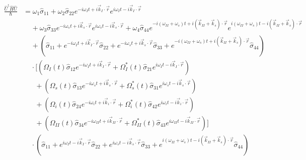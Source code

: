 \documentclass[aps,pra,showpacs,amsmath,amssymb,nofootinbib,longbibliography,superscriptaddress
]{revtex4-1}
\theoremstyle{definition}
\theoremstyle{remark}
\newcommand{\0}{\hat{0}}
\begin{document}
\begin{align}
    \frac{\hat{U}^{\dagger} \hat{H} \hat{U}}{\hbar}
    &= \omega_1 \hat{\sigma}_{11} + \omega_2 \hat{\sigma}_{22} e^{-i \omega_I t + i \vec{k}_I \cdot \vec{r}} e^{i \omega_I t - i \vec{k}_I \cdot \vec{r}} \nonumber \\
    &\;\;\;\;+ \omega_3 \hat{\sigma}_{33} e^{-i \omega_s t + i \vec{k}_s \cdot \vec{r}} e^{i \omega_s t - i \vec{k}_s \cdot \vec{r}} + \omega_4 \hat{\sigma}_{44} e^{-i(\omega_{II} + \omega_s) t + i(\vec{k}_{II} + \vec{k}_s) \cdot \vec{r}} e^{i(\omega_{II} + \omega_s) t - i(\vec{k}_{II} + \vec{k}_s) \cdot \vec{r}} \nonumber \\
    &\;\;\;\;+ \left(\hat{\sigma}_{11} + e^{-i \omega_I t + i \vec{k}_I \cdot \vec{r}} \hat{\sigma}_{22} + e^{-i \omega_s t + i \vec{k}_s \cdot \vec{r}} \hat{\sigma}_{33} + e^{-i(\omega_{II} + \omega_s) t + i(\vec{k}_{II} + \vec{k}_s) \cdot \vec{r}} \hat{\sigma}_{44}\right) \nonumber\\
    &\;\;\;\;\cdot \biggl[ \left(\Omega_{I}(t) \hat{\sigma}_{12} e^{-i \omega_I t + i \vec{k}_I \cdot \vec{r}} + \Omega_{I}^*(t) \hat{\sigma}_{21} e^{i \omega_I t - i \vec{k}_I \cdot \vec{r}}\right)\nonumber \\
    &\;\;\;\;\;\;+ \left(\Omega_{s}(t) \hat{\sigma}_{13} e^{-i \omega_s t + i \vec{k}_{s} \cdot \vec{r}} + \Omega_{s}^*(t) \hat{\sigma}_{31} e^{i \omega_s t - i \vec{k}_{s} \cdot \vec{r}}\right)\nonumber \\
    &\;\;\;\;\;\;+ \left(\Omega_{i}(t) \hat{\sigma}_{24} e^{-i \omega_i t + i \vec{k}_{i} \cdot \vec{r}} + \Omega_{i}^*(t) \hat{\sigma}_{42} e^{i \omega_i t - i \vec{k}_{i} \cdot \vec{r}}\right)\nonumber \\
    &\;\;\;\;\;\;+ \left(\Omega_{II}(t) \hat{\sigma}_{34} e^{-i \omega_{II} t + i \vec{k}_{II} \cdot \vec{r}} + \Omega_{II}^*(t) \hat{\sigma}_{43} e^{i \omega_{II} t - i \vec{k}_{II} \cdot \vec{r}}\right)\biggr] \nonumber \\
    &\;\;\;\; \cdot \left(\hat{\sigma}_{11} + e^{i \omega_I t - i \vec{k}_I \cdot \vec{r}} \hat{\sigma}_{22} + e^{i \omega_s t - i \vec{k}_s \cdot \vec{r}} \hat{\sigma}_{33} + e^{i(\omega_{II} + \omega_s) t - i(\vec{k}_{II} + \vec{k}_s) \cdot \vec{r}} \hat{\sigma}_{44}\right)\nonumber
\end{align}
\end{document}

